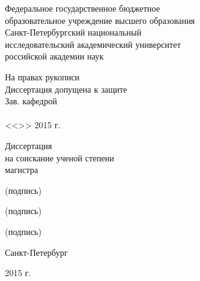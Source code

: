 \begin{titlepage}
\large
\newpage

\begin{center}
Федеральное государственное бюджетное \\
образовательное учреждение высшего образования \\
Санкт-Петербургский национальный \\
исследовательский академический университет \\
российской академии наук
\end{center}

\begin{flushright}
\begin{minipage}[t][12em][c]{30ex}
\begin{center}
На правах рукописи \\
\medskip
Диссертация допущена к защите \\
Зав. кафедрой \\
\hrulefill \\
<<\hspace{2em}>> \hspace{1ex} \hrulefill \hspace{1ex} 2015 г.\\
\end{center}
\end{minipage}
\end{flushright}

\begin{center}
Диссертация \\
на соискание ученой степени \\
магистра \\
\end{center}


\vspace{0.5cm}


\vspace{1.5cm}

\begin{center}
    \small (подпись)
\end{center}

\vspace{0.2cm}

\begin{center}
    \small (подпись)
\end{center}

\vspace{0.2cm}

\begin{center}
    \small (подпись)
\end{center}

\vspace{1cm}

\begin{center}
    Санкт-Петербург

    2015 г.
\end{center}

\normalsize
\end{titlepage}
